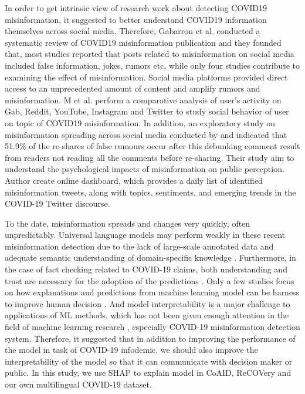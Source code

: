 In order to get intrinsic view of research work about detecting COVID19 misinformation, it suggested to better understand COVID19 information themselves across social media. Therefore, Gabarron et al. 
\cite{gabarron_covid-19-related_2021} conducted a systematic review of COVID19 misinformation publication and they founded that, most studies reported that posts related to misinformation on social media included false information, jokes, rumors etc, while only four studies contribute to examining the effect of misinformation. Social media platforms provided direct access to an unprecedented amount of content and amplify rumors and misinformation. 
M et al.  \cite{cinelli_covid-19_2020} perform a comparative analysis of user's activity on Gab, Reddit, YouTube, Instagram and Twitter to study social behavior of user on topic of COVID19 misinformation. 
In addition, an exploratory study on misinformation spreading across social media conducted by \cite{shahi_exploratory_2020} and indicated that 51.9\% of the re-shares of false rumours occur after this debunking comment result from readers not reading all the comments before re-sharing. 
\cite{sharma_covid-19_2020} Their study aim to understand the psychological impacts of misinformation on public perception. Author create online dashboard, which provides a daily list of identified misinformation tweets, along with topics, sentiments, and emerging trends in the COVID-19 Twitter discourse.



To the date, misinformation spreads and changes very quickly, often unpredictably. Universal language models may perform weakly in these recent misinformation detection due to the lack of large-scale annotated data and adequate semantic understanding of domain-specific knowledge \cite{chen_transformer-based_2021}. Furthermore, in the case of fact checking related to COVID-19 claims, both understanding and trust are necessary for the adoption of the predictions \cite{ayoub_combat_2021}.
Only a few studies focus on how  explanations and predictions from machine learning model can be harness to improve human decision \cite{lai_human_2019}. And model interpretability is a major challenge to applications of ML methods, which has not been given enough attention in the field of machine learning research \cite{yang_municipal_2021}, especially COVID-19 misinformation detection system.  Therefore, it suggested that in addition to improving the performance of the model in task of COVID-19 infodemic, we should also improve the interpretability of the model so that it can communicate with decision maker or public. In this study, we use SHAP \cite{lundberg_unified_2017} to explain model in CoAID, ReCOVery and our own multilingual COVID-19 dataset. 












\par



